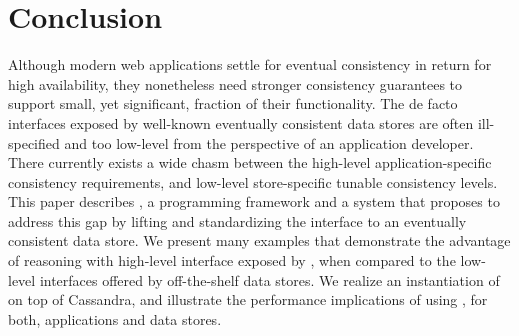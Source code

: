 \section{Conclusion}
\label{sec:conclusion}

Although modern web applications settle for eventual consistency in
return for high availability, they nonetheless need stronger
consistency guarantees to support small, yet significant, fraction of
their functionality. The de facto interfaces exposed by well-known
eventually consistent data stores are often ill-specified and too
low-level from the perspective of an application developer. There
currently exists a wide chasm between the high-level
application-specific consistency requirements, and low-level
store-specific tunable consistency levels. This paper describes \name,
a programming framework and a system that proposes to address this gap
by lifting and standardizing the interface to an eventually consistent
data store.  We present many examples that demonstrate the advantage
of reasoning with high-level interface exposed by \name, when compared
to the low-level interfaces offered by off-the-shelf data stores. We
realize an instantiation of \name on top of Cassandra, and illustrate
the performance implications of using \name, for both, applications
and data stores.
